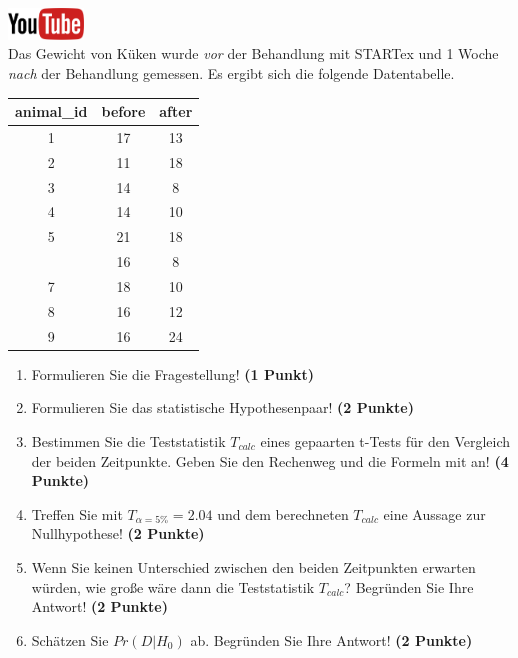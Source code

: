 \documentclass[a4paper, 10pt]{scrartcl}\usepackage[]{graphicx}\usepackage[]{xcolor}
\begin{document}
\hfill\href{https://youtu.be/QR90zyn0Iz8}{\includegraphics[width =
  2cm]{img/youtube}}\\[1Ex]


Das Gewicht von K{\"u}ken wurde \textit{vor} der Behandlung mit STARTex und 1
Woche \textit{nach} der Behandlung gemessen. Es ergibt sich die folgende
Datentabelle.

\begin{table}[!h]
\centering
\begin{tabular}{ccc}
\toprule
animal\_id & before & after\\
\midrule
1 & 17 & 13\\
2 & 11 & 18\\
3 & 14 & 8\\
4 & 14 & 10\\
5 & 21 & 18\\
\addlinespace
6 & 16 & 8\\
7 & 18 & 10\\
8 & 16 & 12\\
9 & 16 & 24\\
\bottomrule
\end{tabular}
\end{table}



\begin{enumerate}
\item Formulieren Sie die Fragestellung! \textbf{(1 Punkt)}
\item Formulieren Sie das statistische Hypothesenpaar! \textbf{(2
    Punkte)}
\item Bestimmen Sie die Teststatistik $T_{calc}$ eines gepaarten t-Tests f{\"u}r den
  Vergleich der beiden Zeitpunkte. Geben Sie den Rechenweg und die Formeln
  mit an! \textbf{(4 Punkte)}
\item Treffen Sie mit $T_{\alpha = 5\%} = 2.04$ und dem berechneten $T_{calc}$ eine Aussage
  zur Nullhypothese! \textbf{(2 Punkte)}
\item Wenn Sie keinen Unterschied zwischen den beiden Zeitpunkten erwarten
  w{\"u}rden, wie gro{\ss}e w{\"a}re dann die Teststatistik $T_{calc}$? Begr{\"u}nden Sie Ihre
  Antwort! \textbf{(2 Punkte)}
\item Sch{\"a}tzen Sie $Pr(D|H_0)$ ab. Begr{\"u}nden Sie Ihre Antwort! \textbf{(2
    Punkte)}
\end{enumerate} 
\clearpage
\end{document}

